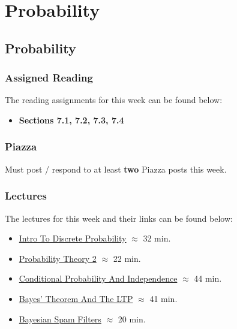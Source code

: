 \clearpage

\renewcommand{\ChapTitle}{Probability}
\renewcommand{\SectionTitle}{Probability}

\chapter{\ChapTitle}
\section{\SectionTitle}

\subsection{Assigned Reading}

The reading assignments for this week can be found below:

\begin{itemize}
    \item \textbf{Sections 7.1, 7.2, 7.3, 7.4}
\end{itemize}

\subsection{Piazza}

Must post / respond to at least \textbf{two} Piazza posts this week.  

\subsection{Lectures}

The lectures for this week and their links can be found below:

\begin{itemize}
    \item \href{https://applied.cs.colorado.edu/mod/hvp/view.php?id=51840}{Intro To Discrete Probability} $\approx$ 32 min.
    \item \href{https://applied.cs.colorado.edu/mod/hvp/view.php?id=51841}{Probability Theory 2} $\approx$ 22 min.
    \item \href{https://applied.cs.colorado.edu/mod/hvp/view.php?id=51842}{Conditional Probability And Independence} $\approx$ 44 min.
    \item \href{https://applied.cs.colorado.edu/mod/hvp/view.php?id=51843}{Bayes' Theorem And The LTP} $\approx$ 41 min.
    \item \href{https://applied.cs.colorado.edu/mod/hvp/view.php?id=51844}{Bayesian Spam Filters} $\approx$ 20 min.
\end{itemize}

